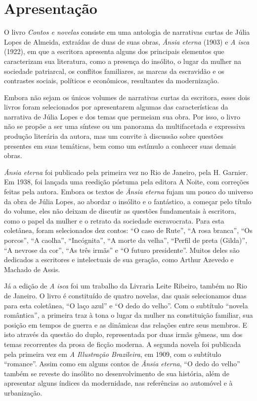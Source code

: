 \chapter{Apresentação}

O livro \emph{Contos e novelas} consiste em uma antologia de narrativas
curtas de Júlia Lopes de Almeida, extraídas de duas de suas obras,
\emph{Ânsia eterna} (1903) e \emph{A isca} (1922), em que a escritora
apresenta alguns dos principais elementos que caracterizam sua
literatura, como a presença do insólito, o lugar da mulher na sociedade
patriarcal, os conflitos familiares, as marcas da escravidão e os
contrastes sociais, políticos e econômicos, resultantes da modernização.

Embora não sejam os únicos volumes de narrativas curtas da escritora,
esses dois livros foram selecionados por apresentarem algumas das
características da narrativa de Júlia Lopes e dos temas que permeiam sua
obra. Por isso, o livro não se propõe a ser uma síntese ou um panorama
da multifacetada e expressiva produção literária da autora, mas um
convite à discussão sobre questões presentes em suas temáticas, bem como
um estímulo a conhecer suas demais obras.

\emph{Ânsia eterna} foi publicado pela primeira vez no Rio de Janeiro,
pela H. Garnier. Em 1938, foi lançada uma reedição póstuma pela editora
A Noite, com correções feitas pela autora. Embora os textos de
\emph{Ânsia eterna} fujam um pouco do universo da obra de Júlia Lopes,
ao abordar o insólito e o fantástico, a começar pelo título do volume,
eles não deixam de discutir as questões fundamentais à escritora, como o
papel da mulher e o retrato da sociedade escravocrata. Para esta
coletânea, foram selecionados dez contos: ``O caso de Rute'', ``A rosa
branca'', ``Os porcos'', ``A caolha'', ``Incógnita'', ``A morte da
velha'', ``Perfil de preta (Gilda)'', ``A nevrose da cor'', ``As três
irmãs'' e ``O futuro presidente''. Muitos deles são dedicados a
escritores e intelectuais de sua geração, como Arthur Azevedo e Machado
de Assis.

Já a edição de \emph{A isca} foi um trabalho da Livraria Leite Ribeiro,
também no Rio de Janeiro. O livro é constituído de quatro novelas, das
quais selecionamos duas para esta coletânea, ``O laço azul'' e ``O dedo
do velho''. Com o subtítulo ``novela romântica'', a primeira traz à tona
o lugar da mulher na constituição familiar, sua posição em tempos de
guerra e as dinâmicas das relações entre seus membros. E isto através da
questão do duplo, representada por duas irmãs gêmeas, um dos temas
recorrentes da prosa de ficção moderna. A segunda novela foi publicada
pela primeira vez em \emph{A Illustração Brazileira}, em 1909, com o
subtítulo ``romance''. Assim como em alguns contos de \emph{Ânsia
eterna}, ``O dedo do velho'' também se reveste do insólito no
desenvolvimento de sua história, além de apresentar alguns índices da
modernidade, nas referências ao automóvel e à urbanização.

